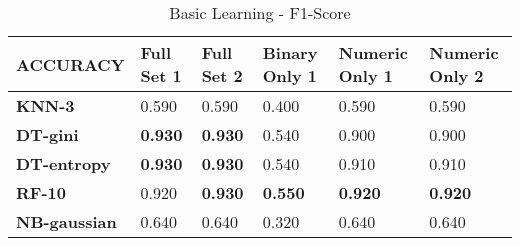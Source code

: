 \documentclass[10pt, conference, compsocconf]{IEEEtran}
\begin{document}
\begin{center}
	\begin{table}[t]
		\centering \footnotesize
		\vspace{0.01cm}
		\caption{Basic Learning - F1-Score}
		\hspace{1cm}
		\begin{tabularx}{\linewidth}{ l  X  X  X  X  X }
			\hline
			\textbf{ACCURACY} &	\textbf{Full Set 1}&	\textbf{Full Set 2}&	\textbf{Binary Only 1}&	\textbf{Numeric Only 1}&	\textbf{Numeric Only 2} \\ \hline
			
			
			\textbf{KNN-3}&	0.590&	0.590&	0.400&	0.590&	0.590\\ \hline
			\textbf{DT-gini}&	\textbf{0.930}&	\textbf{0.930}&	0.540&	0.900&	0.900\\ \hline
			\textbf{DT-entropy}&	\textbf{0.930}&	\textbf{0.930}&	0.540&	0.910&	0.910\\ \hline
			\textbf{RF-10}&	0.920&	\textbf{0.930}&	\textbf{0.550}&	\textbf{0.920}&	\textbf{0.920}\\ \hline
			\textbf{NB-gaussian}&	0.640&	0.640&	0.320&	0.640&	0.640\\ \hline
			
			
		\end{tabularx}\newline
		\vspace{-0.05cm}
		\label{Table2}
	\end{table} \hfil
\end{center}
\end{document}

